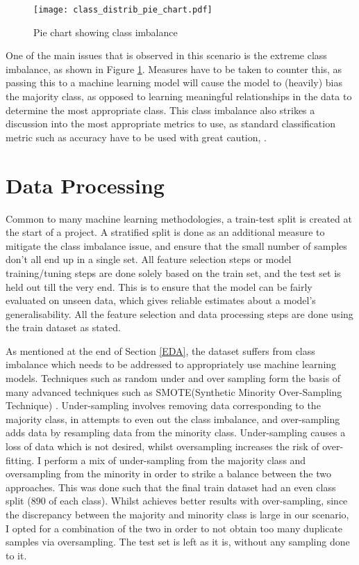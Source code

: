 \documentclass[11pt]{article}
\begin{document}
\begin{figure}
    \centering
    \texttt{[image: class\_distrib\_pie\_chart.pdf]}
    \caption{Pie chart showing class imbalance}
    \label{fig:ClassImbalance}
\end{figure}
One of the main issues that is observed in this scenario is the extreme class imbalance, as shown in Figure \ref{fig:ClassImbalance}. Measures have to be taken to counter this, as passing this to a machine learning model will cause the model to (heavily) bias the majority class, as opposed to learning meaningful relationships in the data to determine the most appropriate class. This class imbalance also strikes a discussion into the most appropriate metrics to use, as standard classification metric such as accuracy have to be used with great caution, \cite{accuracy_misleading}.

\section{Data Processing}

Common to many machine learning methodologies, a train-test split is created at the start of a project. A stratified split is done as an additional measure to mitigate the class imbalance issue, and ensure that the small number of samples don't all end up in a single set. All feature selection steps or model training/tuning steps are done solely based on the train set, and the test set is held out till the very end. This is to ensure that the model can be fairly evaluated on unseen data, which gives reliable estimates about a model's generalisability. All the feature selection and data processing steps are done using the train dataset as stated. 

As mentioned at the end of Section \ref{EDA}, the dataset suffers from class imbalance which needs to be addressed to appropriately use machine learning models. Techniques such as random under and over sampling form the basis of many advanced techniques such as SMOTE(Synthetic Minority Over-Sampling Technique) \cite{smote}. Under-sampling involves removing data corresponding to the majority class, in attempts to even out the class imbalance, and over-sampling adds data by resampling data from the minority class. Under-sampling causes a loss of data which is not desired, whilst oversampling increases the risk of over-fitting. I perform a mix of under-sampling from the majority class and oversampling from the minority in order to strike a balance between the two approaches. This was done such that the final train dataset had an even class split ($890$ of each class). Whilst \cite{under_over_sampling} achieves better results with over-sampling, since the discrepancy between the majority and minority class is large in our scenario, I opted for a combination of the two in order to not obtain too many duplicate samples via oversampling. The test set is left as it is, without any sampling done to it.\\
\end{document}
